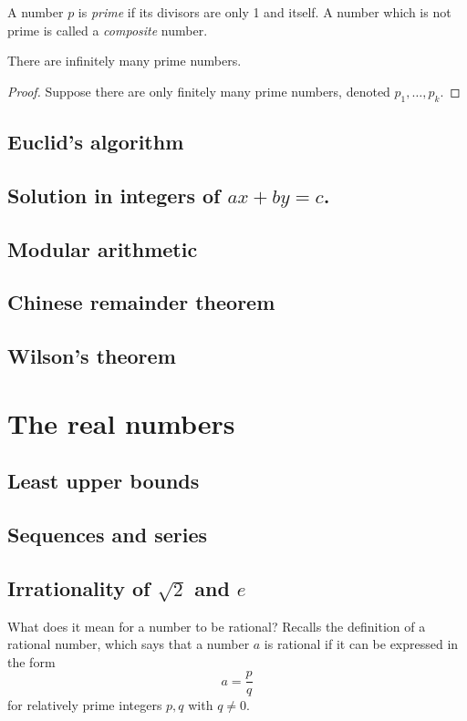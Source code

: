 \documentclass[main.tex]{subfiles}
\begin{document}
			\begin{definition}
				A number $p$ is \textit{prime} if its divisors are only 1 and itself. A number which is not prime is called a \textit{composite} number.
			\end{definition}
			
			\begin{theorem}
				There are infinitely many prime numbers.
			\end{theorem}
			\begin{proof}
				Suppose there are only finitely many prime numbers, denoted $p_1,\ldots, p_k$. 
			\end{proof}
		\subsection{Euclid's algorithm}
		
		\subsection{Solution in integers of $ax + by = c$.}
		
		\subsection{Modular arithmetic}
		
		\subsection{Chinese remainder theorem}
		
		\subsection{Wilson's theorem}
		
	\section{The real numbers}
		\subsection{Least upper bounds}
		
		\subsection{Sequences and series}
		
		\subsection{Irrationality of $\sqrt{2}$ and $e$}
		What does it mean for a number to be rational? Recalls the definition of a rational number, which says that a number $a$ is rational if it can be expressed in the form
		\begin{equation*}
			a = \frac{p}{q}
		\end{equation*}
		for relatively prime integers $p, q$ with $q \neq 0$.
		
\end{document}
